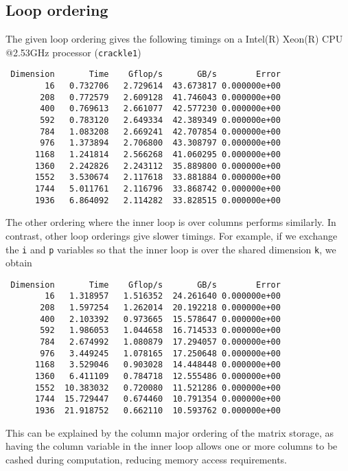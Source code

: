 \documentclass{article}
\begin{document}
\subsection{Loop ordering}
The given loop ordering gives the following timings on a Intel(R) Xeon(R) CPU
@2.53GHz processor (\texttt{crackle1})
\begin{verbatim}
 Dimension       Time    Gflop/s       GB/s        Error
        16   0.732706   2.729614  43.673817 0.000000e+00
       208   0.772579   2.609128  41.746043 0.000000e+00
       400   0.769613   2.661077  42.577230 0.000000e+00
       592   0.783120   2.649334  42.389349 0.000000e+00
       784   1.083208   2.669241  42.707854 0.000000e+00
       976   1.373894   2.706800  43.308797 0.000000e+00
      1168   1.241814   2.566268  41.060295 0.000000e+00
      1360   2.242826   2.243112  35.889800 0.000000e+00
      1552   3.530674   2.117618  33.881884 0.000000e+00
      1744   5.011761   2.116796  33.868742 0.000000e+00
      1936   6.864092   2.114282  33.828515 0.000000e+00
\end{verbatim}
The other ordering where the inner loop is over columns performs similarly. In
contrast, other loop orderings give slower timings. For example, if we exchange
the \texttt{i} and \texttt{p} variables so that the inner loop is over the
shared dimension \texttt{k}, we obtain
\begin{verbatim}
 Dimension       Time    Gflop/s       GB/s        Error
        16   1.318957   1.516352  24.261640 0.000000e+00
       208   1.597254   1.262014  20.192218 0.000000e+00
       400   2.103392   0.973665  15.578647 0.000000e+00
       592   1.986053   1.044658  16.714533 0.000000e+00
       784   2.674992   1.080879  17.294057 0.000000e+00
       976   3.449245   1.078165  17.250648 0.000000e+00
      1168   3.529046   0.903028  14.448448 0.000000e+00
      1360   6.411109   0.784718  12.555486 0.000000e+00
      1552  10.383032   0.720080  11.521286 0.000000e+00
      1744  15.729447   0.674460  10.791354 0.000000e+00
      1936  21.918752   0.662110  10.593762 0.000000e+00
\end{verbatim}
This can be explained by the column major ordering of the matrix storage, as
having the column variable in the inner loop allows one or more columns to be
cashed during computation, reducing memory access requirements.
\end{document}

